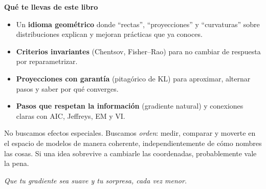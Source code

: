 \documentclass[12pt,letterpaper]{book}
\begin{document}
\textbf{Qué te llevas de este libro}

\begin{itemize}
	\item Un \textbf{idioma geométrico} donde “rectas”, “proyecciones” y “curvaturas” sobre distribuciones explican y mejoran prácticas que ya conoces.
	\item \textbf{Criterios invariantes} (Chentsov, Fisher--Rao) para no cambiar de respuesta por reparametrizar.
	\item \textbf{Proyecciones con garantía} (pitagórico de KL) para aproximar, alternar pasos y saber por qué converges.
	\item \textbf{Pasos que respetan la información} (gradiente natural) y conexiones claras con AIC, Jeffreys, EM y VI.
\end{itemize}

No buscamos efectos especiales. Buscamos \emph{orden}: medir, comparar y moverte en el espacio de modelos de manera coherente, independientemente de cómo nombres las cosas. Si una idea sobrevive a cambiarle las coordenadas, probablemente vale la pena.

\begin{flushright}
	\emph{Que tu gradiente sea suave y tu sorpresa, cada vez menor.}
\end{flushright}

\endgroup

	
\end{document}
